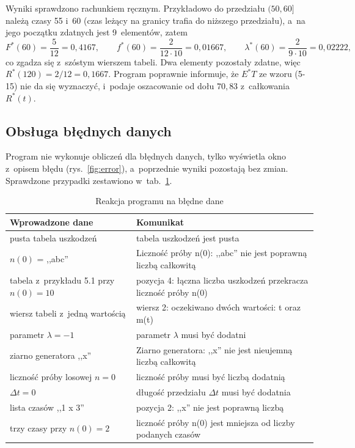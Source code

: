 Wyniki sprawdzono rachunkiem ręcznym. Przykładowo do przedziału $(50, 60]$ należą
czasy 55 i~60 (czas leżący na granicy trafia do niższego przedziału), a~na jego
początku zdatnych jest 9~elementów, zatem
\begin{equation*}
  F^*(60) = \frac{5}{12} = 0{,}4167, \qquad
  f^*(60) = \frac{2}{12 \cdot 10} = 0{,}01667, \qquad
  \lambda^*(60) = \frac{2}{9 \cdot 10} = 0{,}02222,
\end{equation*}
co zgadza się z~szóstym wierszem tabeli. Dwa elementy pozostały zdatne, więc
$R^*(120) = 2/12 = 0{,}1667$. Program poprawnie informuje, że $E^*T$ ze wzoru (5-15)
nie da się wyznaczyć, i~podaje oszacowanie od dołu $70{,}83$ z~całkowania $R^*(t)$.

\subsection{Obsługa błędnych danych}

Program nie wykonuje obliczeń dla błędnych danych, tylko wyświetla okno z~opisem
błędu (rys.~\ref{fig:error}), a~poprzednie wyniki pozostają bez zmian. Sprawdzone
przypadki zestawiono w~tab.~\ref{tab:errors}.

\begin{table}[H]
  \centering
  \caption{Reakcja programu na błędne dane}
  \label{tab:errors}
  \small
  \begin{tabular}{@{}p{}p{}@{}}
    \toprule
    Wprowadzone dane & Komunikat \\
    \midrule
    pusta tabela uszkodzeń & tabela uszkodzeń jest pusta \\
    $n(0)$ = ,,abc'' & Liczność próby n(0): ,,abc'' nie jest poprawną liczbą całkowitą \\
    tabela z~przykładu 5.1 przy $n(0) = 10$ & pozycja 4: łączna liczba uszkodzeń przekracza
      liczność próby n(0) \\
    wiersz tabeli z~jedną wartością & wiersz 2: oczekiwano dwóch wartości: t oraz m(t) \\
    parametr $\lambda = -1$ & parametr $\lambda$ musi być dodatni \\
    ziarno generatora ,,x'' & Ziarno generatora: ,,x'' nie jest nieujemną liczbą całkowitą \\
    liczność próby losowej $n = 0$ & liczność próby musi być liczbą dodatnią \\
    $\Delta t = 0$ & długość przedziału $\Delta t$ musi być dodatnia \\
    lista czasów ,,1 x 3'' & pozycja 2: ,,x'' nie jest poprawną liczbą \\
    trzy czasy przy $n(0) = 2$ & liczność próby n(0) jest mniejsza od liczby podanych czasów \\
    \bottomrule
  \end{tabular}
\end{table}

